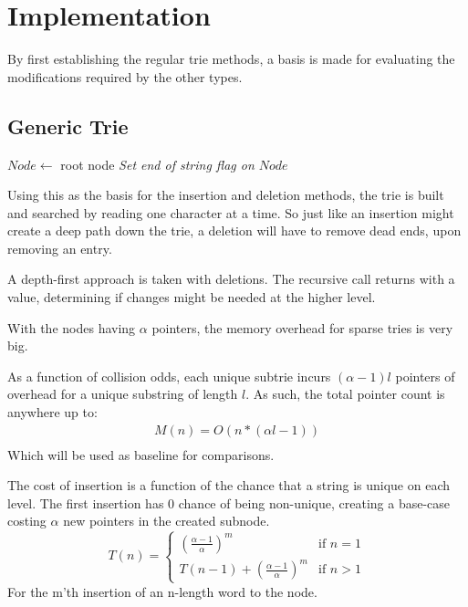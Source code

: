 \chapter{Implementation}
By first establishing the regular trie methods, a basis is made for evaluating
the modifications required by the other types.

\section{Generic Trie}

\begin{algorithm}[H]
    \caption{$k$\FuncSty{)}}
    $Node \leftarrow$  root node\;
    \emph{Set end of string flag on $Node$}\;
\end{algorithm}
Using this as the basis for the insertion and deletion methods, the trie is
built and searched by reading one character at a time. So just like an
insertion might create a deep path down the trie, a deletion will have to
remove dead ends, upon removing an entry.

A depth-first approach is taken with deletions. The recursive call returns with
a value, determining if changes might be needed at the higher level.


With the nodes having $\alpha$ pointers, the memory overhead for sparse tries
is very big.

As a function of collision odds, each unique subtrie incurs $(\alpha-1) l$
pointers of overhead for a unique substring of length $l$. As such, the total
pointer count is anywhere up to:
\begin{align*}
    M(n) = O(n * (\alpha l - 1))\\
\end{align*}
Which will be used as baseline for comparisons.

The cost of insertion is a function of the chance that a string is unique on
each level. The first insertion has 0 chance of being non-unique, creating a
base-case costing $\alpha$ new pointers in the created subnode.
\[
    T(n) = \left\{ \begin{array}{ll}
                    (\frac{\alpha - 1}{\alpha})^m           & \text{if } n = 1 \\
                    T(n-1) + (\frac{\alpha - 1}{\alpha})^m   & \text{if } n > 1
                   \end{array}
                \right.
\]
For the m'th insertion of an n-length word to the node.




